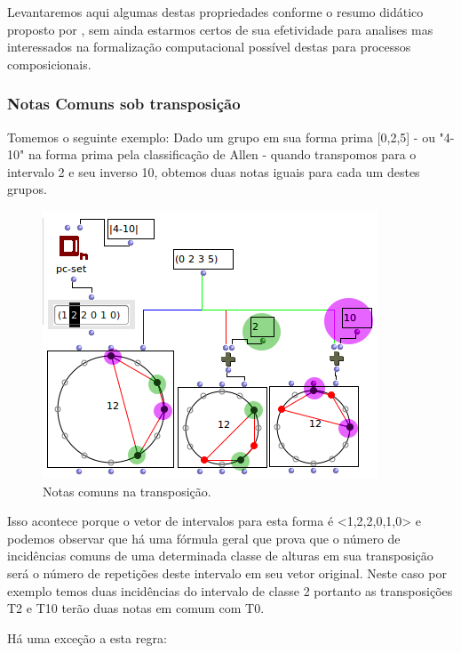 \documentclass[
	12pt,				%
	openright,			%
	twoside,			%
	a4paper,			%
	english,			%
	french,				%
	spanish,			%
	brazil				%
	]{abntex2}
\begin{document}
Levantaremos aqui algumas destas propriedades conforme o resumo didático proposto por \cite{straus2004}, sem ainda estarmos certos de sua efetividade para analises mas interessados na formalização computacional possível destas para processos composicionais.


\subsubsection{Notas Comuns sob transposição}

Tomemos o seguinte exemplo: Dado um grupo em sua forma prima [0,2,5] - ou "4-10" na forma prima pela classificação de Allen  - quando transpomos para o intervalo 2 e seu inverso 10, obtemos duas notas iguais para cada um destes grupos.

\begin{figure}[!h]
	\caption{\label{fig_grafico}Notas comuns na transposição. }
	\begin{center}
	    \includegraphics[scale=0.7]{OM_settheory/notas_comuns_2e10.png}
	\end{center}
\end{figure}



Isso acontece porque o vetor de intervalos para esta forma é <1,2,2,0,1,0> e podemos observar que há uma fórmula geral que prova que o número de incidências comuns de uma determinada classe de alturas em sua transposição será o número de repetições deste intervalo em seu vetor original. Neste caso por exemplo temos duas incidências do intervalo de classe 2 portanto as transposições T2 e T10 terão duas notas em comum com T0.

Há uma exceção a esta regra:
 
\end{document}

